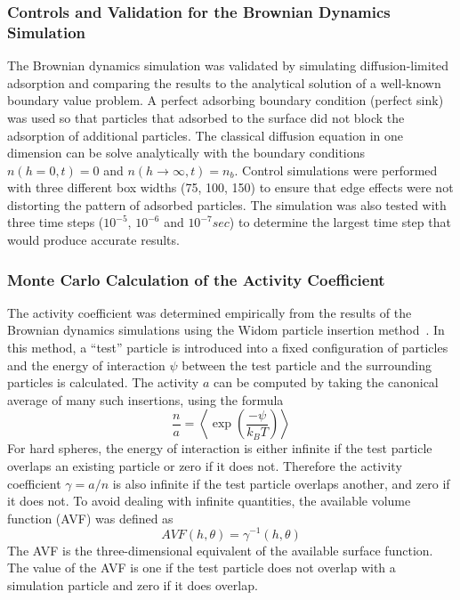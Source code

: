 \subsubsection{Controls and Validation for the Brownian Dynamics Simulation}

The Brownian dynamics simulation was validated by simulating diffusion-limited
adsorption and comparing the results to the analytical solution of
a well-known boundary value problem. A perfect adsorbing boundary
condition (perfect sink) was used so that particles that adsorbed
to the surface did not block the adsorption of additional particles.
The classical diffusion equation in one dimension can be solve analytically
with the boundary conditions $n(h=0,t)=0$ and $n(h\rightarrow\infty,t)=n_{b}$.
Control simulations were performed with three different box widths
(75, 100, 150) to ensure that edge effects were not distorting the
pattern of adsorbed particles. The simulation was also tested with
three time steps ($10^{-5}$, $10^{-6}$ and $10^{-7}sec$) to determine
the largest time step that would produce accurate results.


\subsubsection{Monte Carlo Calculation of the Activity Coefficient}

The activity coefficient was determined empirically from the results
of the Brownian dynamics simulations using the Widom particle insertion
method~\cite{Widom1963,Dullens2005}. In this method, a {}``test''
particle is introduced into a fixed configuration of particles and
the energy of interaction $\psi$ between the test particle and the
surrounding particles is calculated. The activity $a$ can be computed
by taking the canonical average of many such insertions, using the
formula\begin{equation}
\frac{n}{a}=\left\langle \exp\left(\frac{-\psi}{k_{B}T}\right)\right\rangle \label{eq:Widom equation}\end{equation}
For hard spheres, the energy of interaction is either infinite if
the test particle overlaps an existing particle or zero if it does
not. Therefore the activity coefficient $\gamma=a/n$ is also infinite
if the test particle overlaps another, and zero if it does not. To
avoid dealing with infinite quantities, the available volume function
(AVF) was defined as \begin{equation}
AVF\left(h,\theta\right)=\gamma^{-1}\left(h,\theta\right)\label{eq:AVF}\end{equation}
The AVF is the three-dimensional equivalent of the available surface
function. The value of the AVF is one if the test particle does not
overlap with a simulation particle and zero if it does overlap. 

